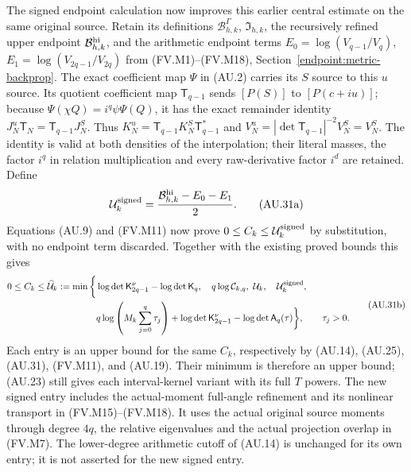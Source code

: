 The signed endpoint calculation now improves this earlier central
estimate on the same original source. Retain its definitions
$\mathcal B^\Gamma_{h,k}$, $\mathfrak I_{h,k}$, the recursively refined upper endpoint $\mathcal B_{h,k}^{\rm hi}$, and the arithmetic
endpoint terms $E_0=\log(V_{q-1}/V_q)$,
$E_1=\log(V_{2q-1}/V_{2q})$ from (FV.M1)--(FV.M18),
Section~\ref{endpoint:metric-backprop}. The exact coefficient map
$\Psi$ in (AU.2) carries its $S$ source to this $u$ source. Its
quotient coefficient map $\mathsf T_{q-1}$ sends $[P(S)]$ to
$[P(c+iu)]$; because $\Psi(\chi Q)=i^q\psi\Psi(Q)$, it has
the exact remainder identity
$J_N^u\mathsf T_N=\mathsf T_{q-1}J_N^S$.
Thus $K_N^u=\mathsf T_{q-1}K_N^S\mathsf T_{q-1}^*$ and
$V_N^u=|\det\mathsf T_{q-1}|^{-2}V_N^S=V_N^S$.
The identity is valid at both densities of the interpolation; their
literal masses, the factor $i^q$ in relation multiplication and every
raw-derivative factor $i^d$ are retained. Define
\[
 \mathcal U_k^{\rm signed}
 =\frac{\mathcal B_{h,k}^{\rm hi}-E_0-E_1}{2}.
 \tag{AU.31a}\label{au:signed-upper}
\]
Equations (AU.9) and (FV.M11) now prove $0\le C_k\le
\mathcal U_k^{\rm signed}$ by substitution, with no endpoint term
discarded. Together with the existing proved bounds this gives
\[
 \begin{aligned}
 0\le C_k\le\widehat{\mathcal U}_k:=\min\bigg\{&
 \log\det\mathsf K_{2q-1}^{\nu}-\log\det\mathsf K_q,\quad
 q\log\mathcal C_{k,q},\ \mathcal U_k,\quad
 \mathcal U_k^{\rm signed},\\
 &q\log\left(M_k\sum_{j=0}^q\tau_j\right)
  +\log\det\mathsf K_{2q-1}^{\nu}-\log\det\mathsf A_q(\tau)
 \bigg\},\qquad \tau_j>0.
 \end{aligned}\tag{AU.31b}\label{au:combined-upper}
\]
Each entry is an upper bound for the same $C_k$, respectively by
(AU.14), (AU.25), (AU.31), (FV.M11), and (AU.19).
Their minimum is therefore an upper bound; (AU.23) still gives each
interval-kernel variant with its full $T$ powers. The new signed entry includes the actual-moment full-angle refinement and
its nonlinear transport in (FV.M15)--(FV.M18). It uses the actual original source moments through degree $4q$, the
relative eigenvalues and the actual projection overlap in (FV.M7).
The lower-degree arithmetic cutoff of (AU.14) is unchanged for its
own entry; it is not asserted for the new signed entry.

